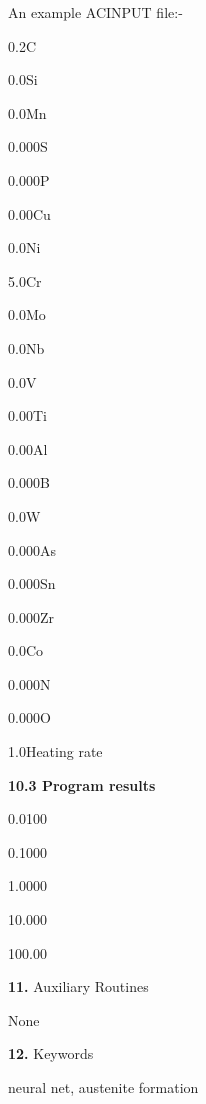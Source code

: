 \medskip
\item {} An example ACINPUT file:-
\bigskip
\item {0.2}\indent	 C
\item {0.0}\indent 	 Si
\item {0.0}\indent	 Mn
\item {0.000}\indent 	 S
\item {0.000}\indent	 P
\item {0.00}\indent	 Cu
\item {0.0}\indent	Ni
\item {5.0}\indent	Cr
\item {0.0}\indent	Mo
\item {0.0}\indent	Nb
\item {0.0}\indent	V
\item {0.00}\indent	Ti
\item {0.00}\indent     Al
\item {0.000}\indent   B
\item {0.0}\indent     W
\item {0.000}\indent	As
\item {0.000}\indent	Sn
\item {0.000}\indent	Zr
\item {0.0}\indent	Co
\item {0.000}\indent	N
\item {0.000}\indent	O
\item {1.0}\indent	Heating rate
\item {} {\bf 10.3 Program results}
\bigskip
\item {0.0100}   
\item {0.1000}   
\item {1.0000}   
\item {10.000}   
\item {100.00}   
\item{\bf 11.} {\largeb  Auxiliary Routines}
\bigskip
\item {} None
\item{\bf 12.} {\largeb  Keywords}
\bigskip
\item {} neural net, austenite formation
\bye

